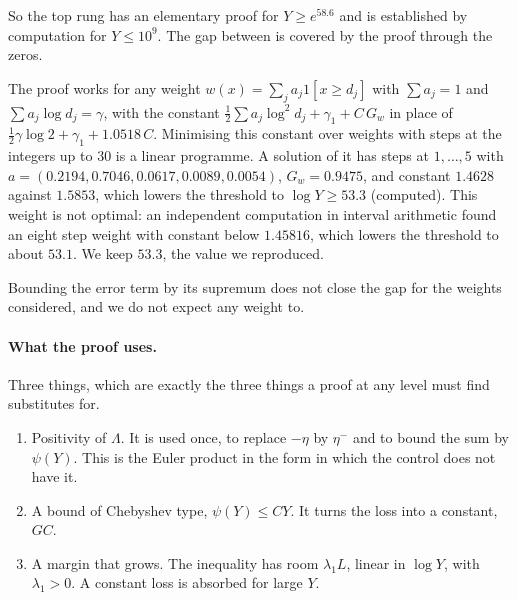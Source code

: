 So the top rung has an elementary proof for $Y\ge e^{58.6}$ and is established by computation for $Y\le10^9$. The gap between is covered by the proof through the zeros.

\begin{computation}\label{bo:comp:lp}
The proof works for any weight $w(x)=\sum_ja_j1[x\ge d_j]$ with $\sum a_j=1$ and $\sum a_j\log d_j=\gamma$, with the constant $\frac12\sum a_j\log^2d_j+\gamma_1+C\,G_w$ in place of $\frac12\gamma\log2+\gamma_1+1.0518\,C$. Minimising this constant over weights with steps at the integers up to $30$ is a linear programme. A solution of it has steps at $1,\dots,5$ with $a=(0.2194,0.7046,0.0617,0.0089,0.0054)$, $G_w=0.9475$, and constant $1.4628$ against $1.5853$, which lowers the threshold to $\log Y\ge53.3$ (computed). This weight is not optimal: an independent computation in interval arithmetic found an eight step weight with constant below $1.45816$, which lowers the threshold to about $53.1$. We keep $53.3$, the value we reproduced.
\end{computation}

Bounding the error term by its supremum does not close the gap for the weights considered, and we do not expect any weight to.%

\paragraph{What the proof uses.} Three things, which are exactly the three things a proof at any level must find substitutes for.
\begin{enumerate}
\item Positivity of $\Lambda$. It is used once, to replace $-\eta$ by $\eta^-$ and to bound the sum by $\psi(Y)$. This is the Euler product in the form in which the control does not have it.
\item A bound of Chebyshev type, $\psi(Y)\le CY$. It turns the loss into a constant, $GC$.
\item A margin that grows. The inequality has room $\lambda_1L$, linear in $\log Y$, with $\lambda_1>0$. A constant loss is absorbed for large $Y$.
\end{enumerate}

